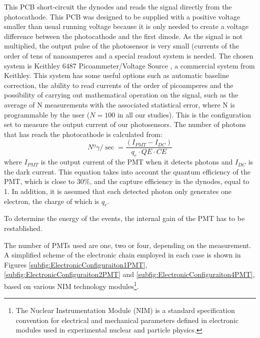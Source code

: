 This PCB short-circuit the dynodes and reads the signal directly from the photocathode. This PCB was designed to be supplied with a positive voltage smaller than usual running voltage because it is only needed to create a voltage difference between the photocathode and the first dinode. As the signal is not multiplied, the output pulse of the photosensor is very small (currents of the order of tens of nanoamperes and a special readout system is needed. The chosen system is Keithley 6487 Picoammeter/Voltage Source \cite{DataSheetKeithley6487}, a commercial system from Keithley. This system has some useful options such as automatic baseline correction, the ability to read currents of the order of picoamperes and the possibility of carrying out mathematical operation on the signal, such as the average of N measurements with the associated statistical error, where N is programmable by the user ($N=100$ in all our studies). This is the configuration set to measure the output current of our photosensors. The number of photons that has reach the photocathode is calculated from:
\begin{equation}
Nº\gamma/\sec = \frac{\left( I_{PMT} - I_{DC} \right)}{q_e \cdot{} QE \cdot{} CE}
\label{eq:NumPhotonsFromIntensityPMT}
\end{equation}
where $I_{PMT}$ is the output current of the PMT when it detects photons and $I_{DC}$ is the dark current. This equation takes into account the quantum efficiency of the PMT, which is close to $30\%$, and the capture efficiency in the dynodes, equal to 1. In addition, it is assumed that each detected photon only generates one electron, the charge of which is $q_e$.

To determine the energy of the events, the internal gain of the PMT has to be restablished. 

The number of PMTs used are one, two or four, depending on the measurement. A simplified scheme of the electronic chain employed in each case is shown in Figures \ref{subfig:ElectronicConfiguraiton1PMT}, \ref{subfig:ElectronicConfiguraiton2PMT} and \ref{subfig:ElectronicConfiguraiton4PMT}, based on various NIM technology modules\footnote{The Nuclear Instrumentation Module (NIM) is a standard specification convention for electrical and mechanical parameters defined in electronic modules used in experimental nuclear and particle physics.}.

